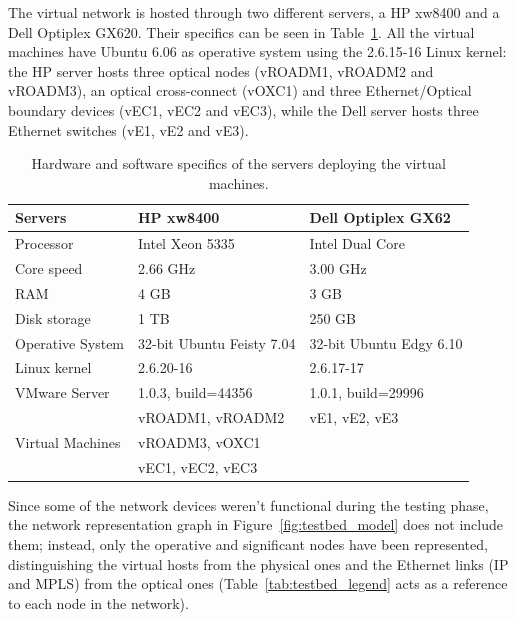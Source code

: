 \documentclass[10pt,a4paper]{report}
\begin{document}
The virtual network is hosted through two different servers, a HP
xw8400 and a Dell Optiplex GX620. Their specifics can be seen in
Table~\ref{tab:testbed_vm}. All the virtual machines have Ubuntu 6.06
as operative system using the 2.6.15-16 Linux kernel: the HP server
hosts three optical nodes (vROADM1, vROADM2 and vROADM3), an optical
cross-connect (vOXC1) and three Ethernet/Optical boundary devices
(vEC1, vEC2 and vEC3), while the Dell server hosts three Ethernet
switches (vE1, vE2 and vE3).
 
\begin{table}[!htbp]
  \begin{center}
    \begin{tabular}{|l|l|l|}
      \hline
      Servers & \textbf{HP xw8400} & \textbf{Dell Optiplex GX62} \\
      \hline \hline
      Processor & Intel Xeon 5335 & Intel Dual Core\\ \hline
      Core speed & 2.66 GHz & 3.00 GHz \\ \hline
      RAM & 4 GB & 3 GB \\ \hline
      Disk storage & 1 TB & 250 GB \\ \hline
      Operative System & 32-bit Ubuntu Feisty 7.04 & 32-bit Ubuntu Edgy
      6.10 \\ \hline
      Linux kernel & 2.6.20-16 & 2.6.17-17 \\ \hline
      VMware Server & 1.0.3, build=44356 & 1.0.1, build=29996 \\ \hline
      \multirow{3}{*}{Virtual Machines} & vROADM1, vROADM2 & vE1, vE2,
      vE3 \\
      & vROADM3, vOXC1 & \\
      & vEC1, vEC2, vEC3 & \\ \hline
    \end{tabular}
    \caption[VM servers specifics]{Hardware and software
      specifics of the servers deploying the virtual machines.}
    \label{tab:testbed_vm}
  \end{center}
\end{table}
 
Since some of the network devices weren't functional during the
testing phase, the network representation graph in
Figure~\ref{fig:testbed_model} does not include them; instead, only
the operative and significant nodes have been represented,
distinguishing the virtual hosts from the physical ones and the
Ethernet links (IP and MPLS) from the optical ones
(Table~\ref{tab:testbed_legend} acts as a reference to each node in
the network).
\end{document}

